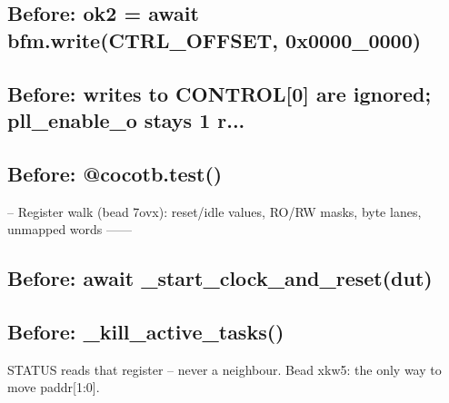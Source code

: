 \begin{record}
\subsection*{Before: ok2 = await bfm.write(CTRL\_OFFSET, 0x0000\_0000)}


\subsection*{Before: writes to CONTROL[0] are ignored; pll\_enable\_o stays 1 r...}


\subsection*{Before: @cocotb.test()}

\begin{textblock}
-- Register walk (bead 7ovx): reset/idle values, RO/RW masks, byte lanes, unmapped words ------
\end{textblock}

\subsection*{Before: await \_start\_clock\_and\_reset(dut)}


\subsection*{Before: \_kill\_active\_tasks()}

\begin{textblock}
STATUS reads that register -- never a neighbour.  Bead xkw5: the only way to move paddr[1:0].
\end{textblock}

\end{record}

